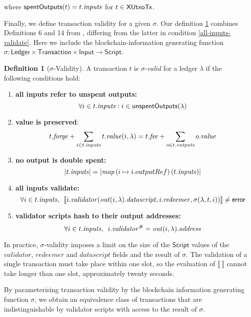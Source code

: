 \documentclass[a4paper]{article}
\theoremstyle{definition}  %
\newtheorem{definition}{Definition}
\begin{document}
\noindent where $\mathsf{spentOutputs}(t) = t.\mathit{inputs}$ for $t \in \mathsf{XUtxoTx}$.

Finally, we define transaction validity for a given $\sigma$. Our definition
\ref{def:validity} combines Definitions 6 and 14 from
\cite{Zahnentferner18-UTxO}, differing from the latter in condition
\ref{all-inputs-validate}. Here we include the blockchain-information
generating function $\sigma : \mathsf{Ledger} \times
\mathsf{Transaction} \times \mathsf{Input} \rightarrow
\mathsf{Script}$.

\begin{definition}[$\sigma$-Validity]\label{def:validity} A transaction $t$ is $\sigma$-\emph{valid} for a ledger $\lambda$ if the following conditions hold:
  \begin{enumerate} 
    \item \label{all-inputs-refer-to-unspent-outputs} \textbf{all
      inputs refer to unspent outputs:}
      \[
        \forall i \in t.\mathit{inputs}: i \in \mathsf{unspentOutputs}(\lambda)
      \]
    \item \label{value-is-preserved} \textbf{value is preserved}:
    \[
      t.\mathit{forge} + \sum_{i \in t.\mathit{inputs}} t.\mathit{value}(i, \lambda) = t.\mathit{fee} + \sum_{o \in t.\mathit{outputs}} o.\mathit{value}
    \]
    \item \label{no-double-spending} \textbf{no output is double spent:}
    \[
      |t.\mathit{inputs}| = |\mathit{map}\, (i \mapsto i.outputRef)\, (t.\mathit{inputs})|
    \]
    \item\label{all-inputs-validate} \textbf{all inputs validate:}
    \[
    \forall i \in t.\mathit{inputs},\enspace \llbracket
    i.\mathit{validator}(\mathit{out}(i, \lambda).\mathit{datascript},i.\mathit{redeemer}, \sigma(\lambda, t, i)) \rrbracket \ne \textsf{error}
      \]
    \item\label{validator-scripts-hash} \textbf{validator scripts hash to their output addresses:}
    \[
      \forall i \in t.\mathit{inputs},\enspace i.\mathit{validator}^{\#} = \mathit{out}(i, \lambda).\mathit{address}
    \]
  \end{enumerate}
\end{definition}

In practice, $\sigma$-validity imposes a limit on the size of the
$\mathsf{Script}$ values of the $validator$, $redeemer$ and
$datascript$ fields and the result of $\sigma$. The validation of a
single transaction must take place within one slot, so the evaluation
of $\llbracket ~ \rrbracket$ cannot take longer than one slot,
approximately twenty seconds.

By parameterising transaction validity by the blockchain information
generating function $\sigma$, we obtain an equivalence class of
transactions that are indistinguishable by validator scripts with
access to the result of $\sigma$.


\end{document}
